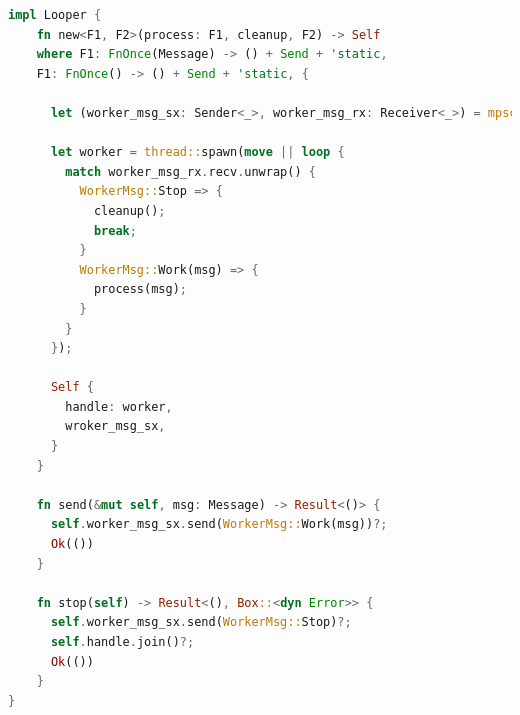 \documentclass[12pt]{article}
\begin{document}
\begin{itemize}
\begin{lstlisting}[language=rust]
impl Looper {
    fn new<F1, F2>(process: F1, cleanup, F2) -> Self
    where F1: FnOnce(Message) -> () + Send + 'static,
    F1: FnOnce() -> () + Send + 'static, {

      let (worker_msg_sx: Sender<_>, worker_msg_rx: Receiver<_>) = mpsc::channel();

      let worker = thread::spawn(move || loop {
        match worker_msg_rx.recv.unwrap() {
          WorkerMsg::Stop => {
            cleanup();
            break;
          }
          WorkerMsg::Work(msg) => {
            process(msg);
          }
        }
      });
      
      Self {
        handle: worker,
        wroker_msg_sx,
      }
    }

    fn send(&mut self, msg: Message) -> Result<()> {
      self.worker_msg_sx.send(WorkerMsg::Work(msg))?;
      Ok(())
    }

    fn stop(self) -> Result<(), Box::<dyn Error>> {
      self.worker_msg_sx.send(WorkerMsg::Stop)?;
      self.handle.join()?;
      Ok(())
    }
}
  \end{lstlisting}
  
  

  
\end{itemize}
\end{document}
